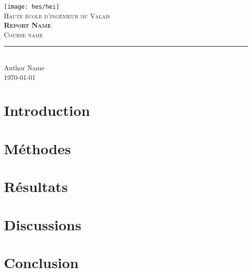 \documentclass[11pt,titlepage]{report}
\begin{document}
\begin{titlepage}
	\centering
    \texttt{[image: hes/hei]}\\[1cm] 	%
    \textsc{\LARGE Haute école d'ingénieur du Valais}\\ \vspace{\fill}
    \textbf{\textsc{\fontsize{35}{35}\selectfont Report Name}}\\ \vspace{\fill}
	\textsc{\LARGE Course name}\\[0.4cm]
	\rule{\linewidth}{0.2 mm} \\[0.5 cm]
	Author Name \\
	\today
\end{titlepage}
\restoregeometry

\tableofcontents

\chapter{Introduction}


\chapter{Méthodes}


\chapter{Résultats}


\chapter{Discussions}


\chapter{Conclusion}

\end{document}
